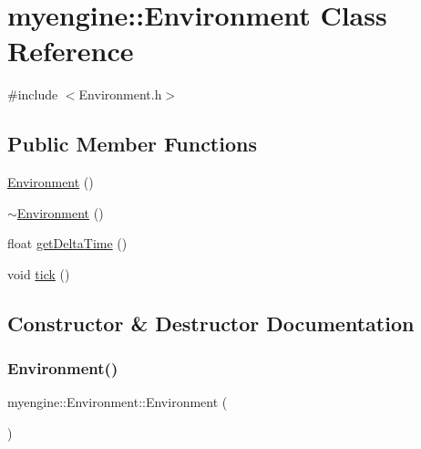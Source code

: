 \hypertarget{classmyengine_1_1_environment}{}\section{myengine\+:\+:Environment Class Reference}
\label{classmyengine_1_1_environment}


{\ttfamily \#include $<$Environment.\+h$>$}

\subsection*{Public Member Functions}
\begin{DoxyCompactItemize}
\item 
\hyperlink{classmyengine_1_1_environment_a3b0875e176697100bcc7e56671e9a3b1}{Environment} ()
\item 
\hyperlink{classmyengine_1_1_environment_a9e1bcf2cb77d6b5729e4d66006c88ce7}{$\sim$\+Environment} ()
\item 
float \hyperlink{classmyengine_1_1_environment_aa1f6d8ffc9d9cce24c9fd6b86445ccbc}{get\+Delta\+Time} ()
\item 
void \hyperlink{classmyengine_1_1_environment_a899c1088832b702e5c4e7d309a68e8fb}{tick} ()
\end{DoxyCompactItemize}


\subsection{Constructor \& Destructor Documentation}
\mbox{\label{classmyengine_1_1_environment_a3b0875e176697100bcc7e56671e9a3b1}} 
\subsubsection{\texorpdfstring{Environment()}{Environment()}}
{\footnotesize\ttfamily myengine\+::\+Environment\+::\+Environment (\begin{DoxyParamCaption}{ }\end{DoxyParamCaption})}

\mbox{\label{classmyengine_1_1_environment_a9e1bcf2cb77d6b5729e4d66006c88ce7}} 
